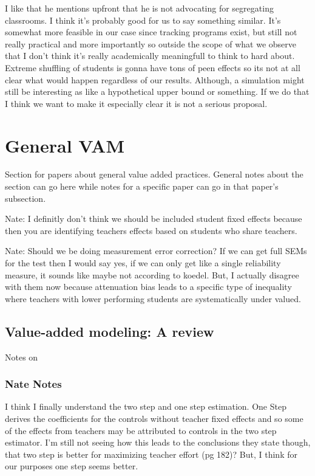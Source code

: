 \documentclass[letterpaper,12pt]{article}
\begin{document}
        I like that he mentions upfront that he is not advocating for segregating classrooms. I think it's probably good for us to say something similar. It's somewhat more feasible in our case since tracking programs exist, but still not really practical and more importantly so outside the scope of what we observe that I don't think it's really academically meaningfull to think to hard about. Extreme shuffling of students is gonna have tons of peen effects so its not at all clear what would happen regardless of our results. Although, a simulation might still be interesting as like a hypothetical upper bound or something. If we do that I think we want to make it especially clear it is not a serious proposal. 

\section{General VAM}

Section for papers about general value added practices. General notes about the section can go here while notes for a specific paper can go in that paper's subsection. 

Nate: I definitly don't think we should be included student fixed effects because then you are identifying teachers effects based on students who share teachers.

Nate: Should we be doing measurement error correction? If we can get full SEMs for the test then I would say yes, if we can only get like a single reliability measure, it sounds like maybe not according to koedel. But, I actually disagree with them now because attenuation bias leads to a specific type of inequality where teachers with lower performing students are systematically under valued. 

    
    \subsection{Value-added modeling: A review}
        
        Notes on \cite{Koedel2015}
        \subsubsection{Nate Notes}
        I think I finally understand the two step and one step estimation. One Step derives the coefficients for the controls without teacher fixed effects and so some of the effects from teachers may be attributed to controls in the two step estimator. I'm still not seeing how this leads to the conclusions they state though, that two step is better for maximizing teacher effort (pg 182)? But, I think for our purposes one step seems better.
         
\end{document}
